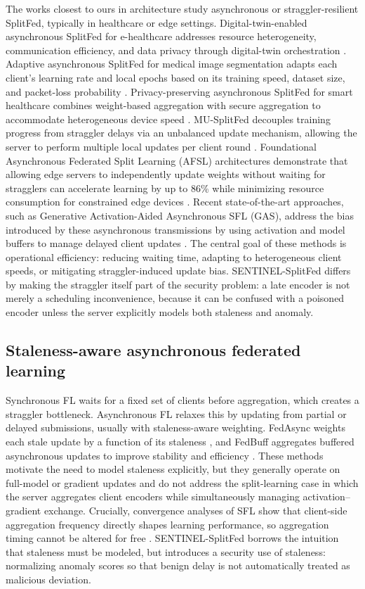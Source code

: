 \documentclass[pdflatex,sn-mathphys-num]{sn-jnl}
\begin{document}
The works closest to ours in architecture study asynchronous or straggler-resilient SplitFed, typically in healthcare or edge settings. Digital-twin-enabled asynchronous SplitFed for e-healthcare addresses resource heterogeneity, communication efficiency, and data privacy through digital-twin orchestration \cite{stephanie2023digital}. Adaptive asynchronous SplitFed for medical image segmentation adapts each client's learning rate and local epochs based on its training speed, dataset size, and packet-loss probability \cite{shiranthika2024adaptive}. Privacy-preserving asynchronous SplitFed for smart healthcare combines weight-based aggregation with secure aggregation to accommodate heterogeneous device speed \cite{app2024splitfed}. MU-SplitFed decouples training progress from straggler delays via an unbalanced update mechanism, allowing the server to perform multiple local updates per client round \cite{liang2025straggler}. Foundational Asynchronous Federated Split Learning (AFSL) architectures demonstrate that allowing edge servers to independently update weights without waiting for stragglers can accelerate learning by up to 86\% while minimizing resource consumption for constrained edge devices \cite{albuquerque2024asynchronous}. Recent state-of-the-art approaches, such as Generative Activation-Aided Asynchronous SFL (GAS), address the bias introduced by these asynchronous transmissions by using activation and model buffers to manage delayed client updates \cite{yang2025gas}. The central goal of these methods is operational efficiency: reducing waiting time, adapting to heterogeneous client speeds, or mitigating straggler-induced update bias. SENTINEL-SplitFed differs by making the straggler itself part of the security problem: a late encoder is not merely a scheduling inconvenience, because it can be confused with a poisoned encoder unless the server explicitly models both staleness and anomaly.

\subsection{Staleness-aware asynchronous federated learning}

Synchronous FL waits for a fixed set of clients before aggregation, which creates a straggler bottleneck. Asynchronous FL relaxes this by updating from partial or delayed submissions, usually with staleness-aware weighting. FedAsync weights each stale update by a function of its staleness \cite{xie2019asynchronous}, and FedBuff aggregates buffered asynchronous updates to improve stability and efficiency \cite{nguyen2022fedbuff}. These methods motivate the need to model staleness explicitly, but they generally operate on full-model or gradient updates and do not address the split-learning case in which the server aggregates client encoders while simultaneously managing activation--gradient exchange. Crucially, convergence analyses of SFL show that client-side aggregation frequency directly shapes learning performance, so aggregation timing cannot be altered for free \cite{adaptsfl2025}. SENTINEL-SplitFed borrows the intuition that staleness must be modeled, but introduces a security use of staleness: normalizing anomaly scores so that benign delay is not automatically treated as malicious deviation.
\end{document}
